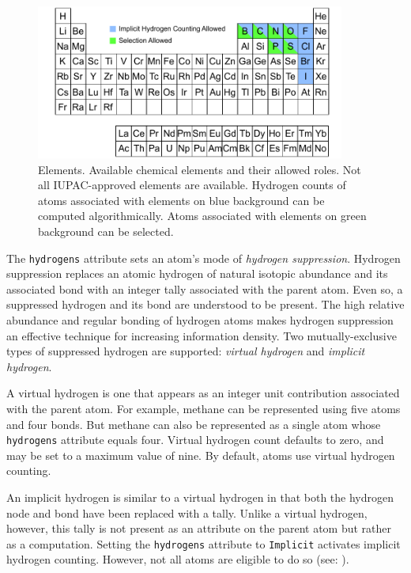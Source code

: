 \documentclass{article}
\def\ttt{\texttt}
\begin{document}
\begin{figure}
    \centering
    \includegraphics[width=4in]{periodic-table.pdf}
    \caption{Elements. Available chemical elements and their allowed roles. Not all IUPAC-approved elements are available. Hydrogen counts of atoms associated with elements on blue background can be computed algorithmically. Atoms associated with elements on green background can be selected.}
    \label{fig:periodic-table}
\end{figure}

The \ttt{hydrogens} attribute sets an atom's mode of \textit{hydrogen suppression}. Hydrogen suppression replaces an atomic hydrogen of natural isotopic abundance and its associated bond with an integer tally associated with the parent atom. Even so, a suppressed hydrogen and its bond are understood to be present. The high relative abundance and regular bonding of hydrogen atoms makes hydrogen suppression an effective technique for increasing information density. Two mutually-exclusive types of suppressed hydrogen are supported: \textit{virtual hydrogen} and \textit{implicit hydrogen}.

A virtual hydrogen is one that appears as an integer unit contribution associated with the parent atom. For example, methane can be represented using five atoms and four bonds. But methane can also be represented as a single atom whose \ttt{hydrogens} attribute equals four. Virtual hydrogen count defaults to zero, and may be set to a maximum value of nine. By default, atoms use virtual hydrogen counting.

An implicit hydrogen is similar to a virtual hydrogen in that both the hydrogen node and bond have been replaced with a tally. Unlike a virtual hydrogen, however, this tally is not present as an attribute on the parent atom but rather as a computation. Setting the \ttt{hydrogens} attribute to \ttt{Implicit} activates implicit hydrogen counting. However, not all atoms are eligible to do so (see: ).
\end{document}
